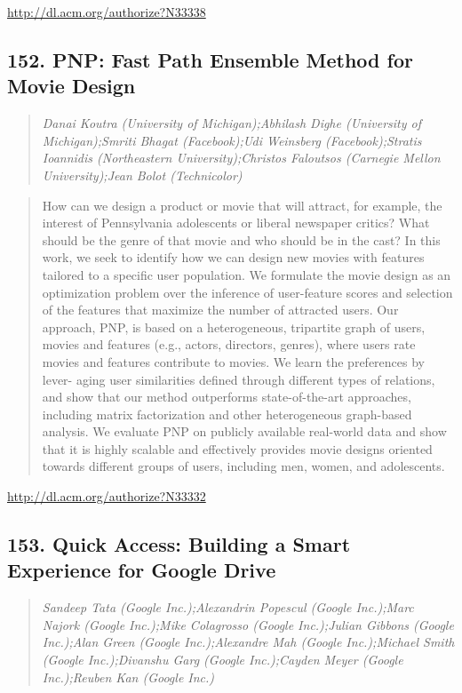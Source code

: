 \documentclass{article}
\begin{document}
\href{http://dl.acm.org/authorize?N33338}{http://dl.acm.org/authorize?N33338}

\subsection{152. PNP: Fast Path Ensemble Method for Movie Design}

\begin{quote}
\footnotesize{\textit{Danai Koutra (University of Michigan);Abhilash Dighe (University of Michigan);Smriti Bhagat (Facebook);Udi Weinsberg (Facebook);Stratis Ioannidis (Northeastern University);Christos Faloutsos (Carnegie Mellon University);Jean Bolot (Technicolor)}}

\end{quote}

\begin{quote}
How can we design a product or movie that will attract, for example, the interest of Pennsylvania adolescents or liberal newspaper critics? What should be the genre of that movie and who should be in the cast? In this work, we seek to identify how we can design new movies with features tailored to a specific user population. We formulate the movie design as an optimization problem over the inference of user-feature scores and selection of the features that maximize the number of attracted users. Our approach, PNP, is based on a heterogeneous, tripartite graph of users, movies and features (e.g., actors, directors, genres), where users rate movies and features contribute to movies. We learn the preferences by lever- aging user similarities defined through different types of relations, and show that our method outperforms state-of-the-art approaches, including matrix factorization and other heterogeneous graph-based analysis. We evaluate PNP on publicly available real-world data and show that it is highly scalable and effectively provides movie designs oriented towards different groups of users, including men, women, and adolescents.
\end{quote}

\href{http://dl.acm.org/authorize?N33332}{http://dl.acm.org/authorize?N33332}

\subsection{153. Quick Access: Building a Smart Experience for Google Drive}

\begin{quote}
\footnotesize{\textit{Sandeep Tata (Google Inc.);Alexandrin Popescul (Google Inc.);Marc Najork (Google Inc.);Mike Colagrosso (Google Inc.);Julian Gibbons (Google Inc.);Alan Green (Google Inc.);Alexandre Mah (Google Inc.);Michael Smith (Google Inc.);Divanshu Garg (Google Inc.);Cayden Meyer (Google Inc.);Reuben Kan (Google Inc.)}}

\end{quote}
\end{document}

